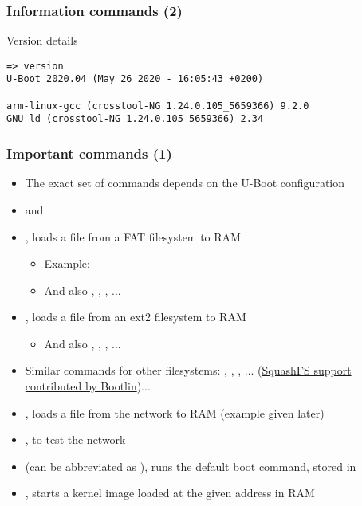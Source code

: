\begin{frame}[fragile]
  \frametitle{Information commands (2)}
\begin{block}{Version details}
{\small
\begin{verbatim}
=> version
U-Boot 2020.04 (May 26 2020 - 16:05:43 +0200)

arm-linux-gcc (crosstool-NG 1.24.0.105_5659366) 9.2.0
GNU ld (crosstool-NG 1.24.0.105_5659366) 2.34
\end{verbatim}}
\end{block}
\end{frame}

\begin{frame}
  \frametitle{Important commands (1)}
  \begin{itemize}
  \item The exact set of commands depends on the U-Boot configuration
  \item {} and 
  \item {}, loads a file from a FAT filesystem to RAM
    \begin{itemize}
    \item Example: 
    \item And also , , ,
          ...
    \end{itemize}
  \item {}, loads a file from an ext2 filesystem to RAM
    \begin{itemize}
    \item And also , , ,
          ...
    \end{itemize}
  \item Similar commands for other filesystems: ,
      , , ...
      (\href{https://bootlin.com/blog/bootlin-contributes-squashfs-support-to-u-boot/}{SquashFS
      support contributed by Bootlin})...
  \item {}, loads a file from the network to RAM (example given later)
  \item {}, to test the network
  \item {} (can be abbreviated as ), runs the default
    boot command, stored in 
  \item {}, starts a kernel image loaded at the
    given address in RAM
  \end{itemize}
\end{frame}

